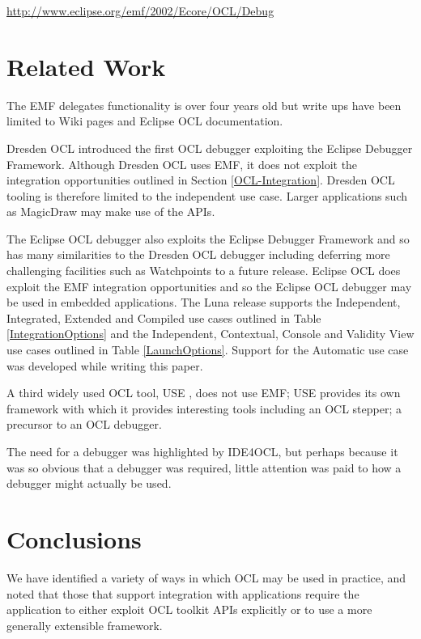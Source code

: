 \documentclass[a4paper]{article}
\begin{document}
\url{http://www.eclipse.org/emf/2002/Ecore/OCL/Debug}

\section{Related Work}\label{Related-Work}

The EMF delegates functionality is over four years old but write ups have been limited to Wiki pages\cite{OCLinEcore} and Eclipse OCL documentation.

Dresden OCL\cite{DresdenOCL-Debug} introduced the first OCL debugger exploiting the Eclipse Debugger Framework. Although Dresden OCL uses EMF, it does not exploit the integration opportunities outlined in Section \ref{OCL-Integration}. Dresden OCL tooling is therefore limited to the independent use case. Larger applications such as MagicDraw may make use of the APIs.

The Eclipse OCL debugger also exploits the Eclipse Debugger Framework and so has many similarities to the Dresden OCL debugger including deferring more challenging facilities such as Watchpoints to a future release. Eclipse OCL does exploit the EMF integration opportunities and so the Eclipse OCL debugger may be used in embedded applications. The Luna release \cite{OCL-Luna} supports the Independent, Integrated, Extended and Compiled use cases outlined in Table \ref{IntegrationOptions} and the Independent, Contextual, Console and Validity View use cases outlined in Table \ref{LaunchOptions}. Support for the Automatic use case was developed while writing this paper.

A third widely used OCL tool, USE \cite{USE}, does not use EMF; USE provides its own framework with which it provides interesting tools including an OCL stepper; a precursor to an OCL debugger.

The need for a debugger was highlighted by IDE4OCL\cite{Chimiak-Opaka}, but perhaps because it was so obvious that a debugger was required, little attention was paid to how a debugger might actually be used.

\section{Conclusions}\label{Conclusion}
We have identified a variety of ways in which OCL may be used in practice, and noted that those that support integration with applications require the application to either exploit OCL toolkit APIs explicitly or to use a more generally extensible framework.
\end{document}
